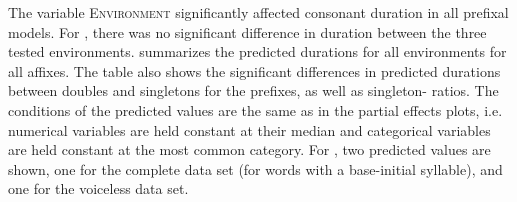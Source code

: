 The variable \textsc{Environment} significantly affected consonant duration in all prefixal models. For , there was no significant difference in duration between the three tested environments.
 summarizes the predicted durations for all environments for all affixes. The table also shows the significant differences in predicted durations between doubles and singletons for the prefixes, as well as singleton- ratios.
The conditions of the predicted values are the same as in the partial effects plots, i.e. numerical variables are held constant at their median and categorical variables are held constant at the most common category. For , two predicted values are shown, one for the complete data set (for words with a  base-initial syllable), and one for the voiceless data set.







